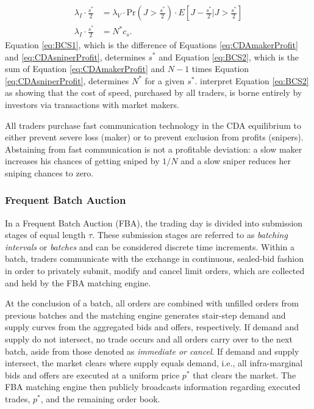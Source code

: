 \documentclass[12pt]{article}
\begin{document}
\begin{align}
\lambda_I \cdot \frac{s^*}{2} & = 
\lambda_V \cdot \textrm{Pr}\left(J > \frac{s^*}{2}\right) \cdot E\left[J-\frac{s^*}{2}|J>\frac{s^*}{2}\right] \label{eq:BCS1} \\
\lambda_I \cdot \frac{s^*}{2} & = N^* c_s. \label{eq:BCS2}
\end{align}
Equation \eqref{eq:BCS1}, which is the difference of Equations \eqref{eq:CDAmakerProfit} and \eqref{eq:CDAsniperProfit}, determines $s^*$ and Equation \eqref{eq:BCS2}, which is the sum of Equation \eqref{eq:CDAmakerProfit} and $N-1$ times Equation \eqref{eq:CDAsniperProfit}, determines $N^*$ for a given $s^*$. \cite{Budish2015} interpret Equation \eqref{eq:BCS2} as showing that the cost of speed, purchased by all traders, is borne entirely by investors via transactions with market makers.

All traders purchase fast communication technology in the CDA equilibrium to either prevent severe loss (maker) or to prevent exclusion from profits (snipers). Abstaining from fast communication is not a profitable deviation: a slow maker increases his chances of getting sniped by $1/N$ and a slow sniper reduces her sniping chances to zero.

\subsubsection{Frequent Batch Auction}
In a Frequent Batch Auction (FBA), the trading day is divided into submission stages of equal length $\tau$. These submission stages are referred to as \textit{batching intervals} or \textit{batches} and can be considered discrete time increments. Within a batch, traders communicate with the exchange in continuous, sealed-bid fashion in order to privately submit, modify and cancel limit orders, which are collected and held by the FBA matching engine. 

At the conclusion of a batch, all orders are combined with unfilled orders from previous batches and the matching engine generates stair-step demand and supply curves from the aggregated bids and offers, respectively. If demand and supply do not intersect, no trade occurs and all orders carry over to the next batch, aside from those denoted as \textit{immediate or cancel}. If demand and supply intersect, the market clears where supply equals demand, i.e., all infra-marginal bids and offers are executed at a uniform price $p^*$ that clears the market. The FBA matching engine then publicly broadcasts information regarding executed trades, $p^*$, and the remaining order book.
\end{document}
